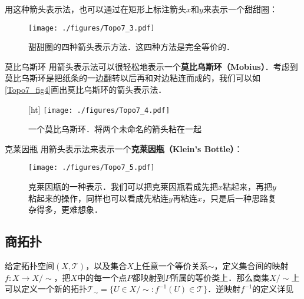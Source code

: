 用这种箭头表示法，也可以通过在矩形上标注箭头$x$和$y$来表示一个甜甜圈：

\begin{figure}[ht]
\centering
\texttt{[image: ./figures/Topo7\_3.pdf]}
\caption{甜甜圈的四种箭头表示方法．这四种方法是完全等价的．} \label{Topo7_fig3}
\end{figure}

\begin{example}{莫比乌斯环}
用箭头表示法可以很轻松地表示一个\textbf{莫比乌斯环（Mobius）}．考虑到莫比乌斯环是把纸条的一边翻转以后再和对边粘连而成的，我们可以如\autoref{Topo7_fig4}画出莫比乌斯环的箭头表示法．

\begin{figure}\label{Topo7_fig6}[ht]
\centering
\texttt{[image: ./figures/Topo7\_4.pdf]}
\caption{一个莫比乌斯环．将两个未命名的箭头粘在一起} \label{Topo7_fig4}
\end{figure}

\end{example}



\begin{example}{克莱因瓶}
用箭头表示法来表示一个\textbf{克莱因瓶（Klein's Bottle）}：
\begin{figure}[ht]
\centering
\texttt{[image: ./figures/Topo7\_5.pdf]}
\caption{克莱因瓶的一种表示．我们可以把克莱因瓶看成先把$x$粘起来，再把$y$粘起来的操作，同样也可以看成先粘连$y$再粘连$x$，只是后一种思路复杂得多，更难想象．} \label{Topo7_fig5}
\end{figure}

\end{example}



\subsection{商拓扑}

给定拓扑空间$(X, \mathcal{T})$，以及集合$X$上任意一个等价关系$\sim$，定义集合间的映射$f:X\rightarrow X/\sim$，把$X$中的每一个点$P$都映射到$P$所属的等价类上．那么商集$X/\sim$上可以定义一个新的拓扑$\mathcal{T}_\sim=\{U\in X/\sim: f^{-1}(U)\in\mathcal{T}\}$．逆映射$f^{-1}$的定义详见



